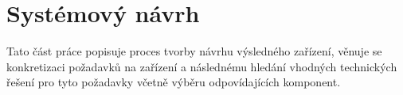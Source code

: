\chapter{Systémový návrh}

Tato část práce popisuje proces tvorby návrhu výsledného zařízení, věnuje se konkretizaci požadavků na zařízení a následnému hledání vhodných technických řešení pro tyto požadavky včetně výběru odpovídajících komponent.















